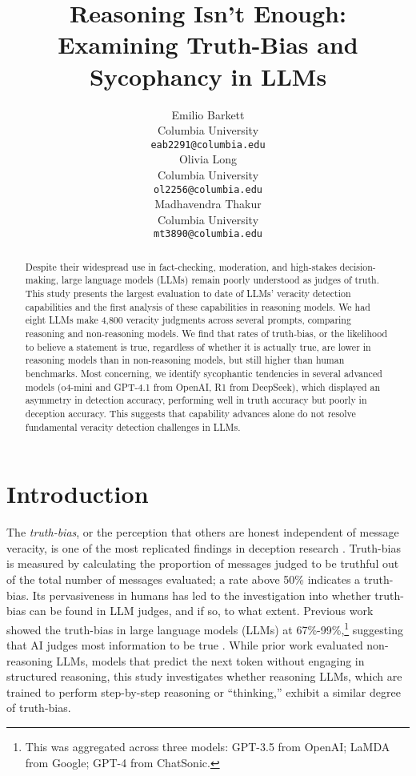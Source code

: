 \documentclass{article}
\title{Reasoning Isn't Enough: \\Examining Truth-Bias and Sycophancy in LLMs}
\author{%
  Emilio Barkett\\
  Columbia University\\
  \texttt{eab2291@columbia.edu} \\
   \And
   Olivia Long \\
   Columbia University \\
   \texttt{ol2256@columbia.edu} \\
   \And
   Madhavendra Thakur \\
   Columbia University \\
   \texttt{mt3890@columbia.edu} \\
}
\begin{document}
\maketitle

\begin{abstract}
\label{sec:abstract}
  Despite their widespread use in fact-checking, moderation, and high-stakes decision-making, large language models (LLMs) remain poorly understood as judges of truth. This study presents the largest evaluation to date of LLMs’ veracity detection capabilities and the first analysis of these capabilities in reasoning models. We had eight LLMs make 4,800 veracity judgments across several prompts, comparing reasoning and non-reasoning models. We find that rates of truth-bias, or the likelihood to believe a statement is true, regardless of whether it is actually true, are lower in reasoning models than in non-reasoning models, but still higher than human benchmarks. Most concerning, we identify sycophantic tendencies in several advanced models (o4-mini and GPT-4.1 from OpenAI, R1 from DeepSeek), which displayed an asymmetry in detection accuracy, performing well in truth accuracy but poorly in deception accuracy. This suggests that capability advances alone do not resolve fundamental veracity detection challenges in LLMs.
\end{abstract}

\section{Introduction}
\label{sec:introduction}

The \textit{truth-bias}, or the perception that others are honest independent of message veracity, is one of the most replicated findings in deception research \citep{levine_duped_2020, levine_truth-default_2014, mccornack_deception_1986, markowitz_generative_2024}. Truth-bias is measured by calculating the proportion of messages judged to be truthful out of the total number of messages evaluated; a rate above 50\% indicates a truth-bias. Its pervasiveness in humans has led to the investigation into whether truth-bias can be found in LLM judges, and if so, to what extent. Previous work showed the truth-bias in large language models (LLMs) at 67\%-99\%,\footnote{This was aggregated across three models: GPT-3.5 from OpenAI; LaMDA from Google; GPT-4 from ChatSonic.} suggesting that AI judges most information to be true \citep{markowitz_generative_2024}. While prior work evaluated non-reasoning LLMs, models that predict the next token without engaging in structured reasoning, this study investigates whether reasoning LLMs, which are trained to perform step-by-step reasoning or ``thinking,'' exhibit a similar degree of truth-bias.
\end{document}
